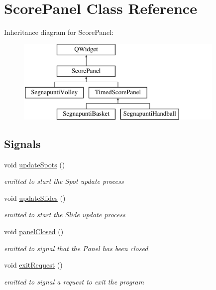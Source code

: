 \hypertarget{classScorePanel}{}\section{Score\+Panel Class Reference}
\label{classScorePanel}
Inheritance diagram for Score\+Panel\+:\begin{figure}[H]
\begin{center}
\leavevmode
\includegraphics[height=4.000000cm]{d3/dba/classScorePanel}
\end{center}
\end{figure}
\subsection*{Signals}
\begin{DoxyCompactItemize}
\item 
\mbox{\label{classScorePanel_aa339aecc1d8808e0cbbf78e4d3cfd195}} 
void \mbox{\hyperlink{classScorePanel_aa339aecc1d8808e0cbbf78e4d3cfd195}{update\+Spots}} ()
\begin{DoxyCompactList}\small\item\em emitted to start the Spot update process \end{DoxyCompactList}\item 
\mbox{\label{classScorePanel_a8b9256b99863d98cd2f7546aafa4c39f}} 
void \mbox{\hyperlink{classScorePanel_a8b9256b99863d98cd2f7546aafa4c39f}{update\+Slides}} ()
\begin{DoxyCompactList}\small\item\em emitted to start the Slide update process \end{DoxyCompactList}\item 
\mbox{\label{classScorePanel_a665992ebbd2a46625fd713593d2393a6}} 
void \mbox{\hyperlink{classScorePanel_a665992ebbd2a46625fd713593d2393a6}{panel\+Closed}} ()
\begin{DoxyCompactList}\small\item\em emitted to signal that the Panel has been closed \end{DoxyCompactList}\item 
\mbox{\label{classScorePanel_a1c0b06c69f565e8f3ecb013d42bb130e}} 
void \mbox{\hyperlink{classScorePanel_a1c0b06c69f565e8f3ecb013d42bb130e}{exit\+Request}} ()
\begin{DoxyCompactList}\small\item\em emitted to signal a request to exit the program \end{DoxyCompactList}\end{DoxyCompactItemize}
